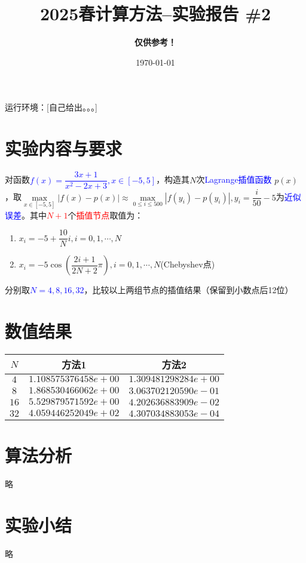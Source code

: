 \documentclass[UTF8]{ctexart}
\title{\textbf {2025春计算方法--实验报告 \#2}}
\author{\textbf{\color{red}仅供参考！}}
\date{\today}
\begin{document}
\maketitle

运行环境：[自己给出。。。]

\section*{实验内容与要求}

    对函数\textcolor{blue}{$f(x)=\dfrac{3x+1}{x^2-2x+3},x\in[-5,5]$}，构造其$N$次\textcolor{blue}{Lagrange插值函数} $p(x)$，取$\max\limits_{x\in[-5,5]}|f(x)-p(x)|\approx\max\limits_{0\leq i\leq 500}|f(y_i)-p(y_i)|,y_i=\dfrac{i}{50}-5$为\textcolor{blue}{近似误差}。其中\textcolor{red}{$N+1$}个\textcolor{red}{插值节点}取值为：

    \begin{enumerate}
        \item $x_i=-5+\dfrac{10}{N}i,i=0,1,\cdots,N$
        \item $x_i=-5\cos\left(\dfrac{2i+1}{2N+2}\pi\right),i=0,1,\cdots,N$(Chebyshev点)
    \end{enumerate}

    分别取\textcolor{blue}{$N=4,8,16,32$}，比较以上两组节点的插值结果（保留到小数点后12位）


\section{数值结果}


    \begin{table}[H]
        \begin{center}
            \begin{tabular}{|c|c|c|}
                \hline
                $N$ & 方法1 & 方法2 \\
                \hline
                $4$ & $1.108575376458e+00$ & $1.309481298284e+00$ \\
                \hline
                $8$ & $1.868530466062e+00$ & $3.063702120590e-01$ \\
                \hline
                $16$ & $5.529879571592e+00$ & $4.202636883909e-02$ \\
                \hline
                $32$ & $4.059446252049e+02$ & $4.307034883053e-04$ \\
                \hline
            \end{tabular}
        \end{center}
    \end{table}


\section{算法分析}

    略

\section{实验小结}

    略
\end{document}
